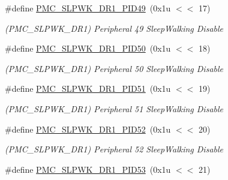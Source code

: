 \begin{DoxyCompactItemize}
\mbox{\label{group__SAMS70__PMC_gaf486f7e217b7465f8dbdac9d83d50ffd}} 
\#define \mbox{\hyperlink{group__SAMS70__PMC_gaf486f7e217b7465f8dbdac9d83d50ffd}{P\+M\+C\+\_\+\+S\+L\+P\+W\+K\+\_\+\+D\+R1\+\_\+\+P\+I\+D49}}~(0x1u $<$$<$ 17)
\begin{DoxyCompactList}\small\item\em (P\+M\+C\+\_\+\+S\+L\+P\+W\+K\+\_\+\+D\+R1) Peripheral 49 Sleep\+Walking Disable \end{DoxyCompactList}\item 
\mbox{\label{group__SAMS70__PMC_ga9ac2b90f28a4c61bb37a6fa7dff3ac06}} 
\#define \mbox{\hyperlink{group__SAMS70__PMC_ga9ac2b90f28a4c61bb37a6fa7dff3ac06}{P\+M\+C\+\_\+\+S\+L\+P\+W\+K\+\_\+\+D\+R1\+\_\+\+P\+I\+D50}}~(0x1u $<$$<$ 18)
\begin{DoxyCompactList}\small\item\em (P\+M\+C\+\_\+\+S\+L\+P\+W\+K\+\_\+\+D\+R1) Peripheral 50 Sleep\+Walking Disable \end{DoxyCompactList}\item 
\mbox{\label{group__SAMS70__PMC_gaa0ca00032c84b2ac985009d303b9a492}} 
\#define \mbox{\hyperlink{group__SAMS70__PMC_gaa0ca00032c84b2ac985009d303b9a492}{P\+M\+C\+\_\+\+S\+L\+P\+W\+K\+\_\+\+D\+R1\+\_\+\+P\+I\+D51}}~(0x1u $<$$<$ 19)
\begin{DoxyCompactList}\small\item\em (P\+M\+C\+\_\+\+S\+L\+P\+W\+K\+\_\+\+D\+R1) Peripheral 51 Sleep\+Walking Disable \end{DoxyCompactList}\item 
\mbox{\label{group__SAMS70__PMC_gab88c17991c3799f2ac218ae9bb32fe4f}} 
\#define \mbox{\hyperlink{group__SAMS70__PMC_gab88c17991c3799f2ac218ae9bb32fe4f}{P\+M\+C\+\_\+\+S\+L\+P\+W\+K\+\_\+\+D\+R1\+\_\+\+P\+I\+D52}}~(0x1u $<$$<$ 20)
\begin{DoxyCompactList}\small\item\em (P\+M\+C\+\_\+\+S\+L\+P\+W\+K\+\_\+\+D\+R1) Peripheral 52 Sleep\+Walking Disable \end{DoxyCompactList}\item 
\mbox{\label{group__SAMS70__PMC_ga05d44f982b76fd967b0d503d96cff30d}} 
\#define \mbox{\hyperlink{group__SAMS70__PMC_ga05d44f982b76fd967b0d503d96cff30d}{P\+M\+C\+\_\+\+S\+L\+P\+W\+K\+\_\+\+D\+R1\+\_\+\+P\+I\+D53}}~(0x1u $<$$<$ 21)
$$
\end{DoxyCompactItemize}

